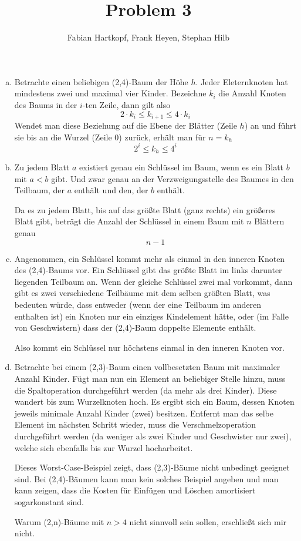 \documentclass{scrartcl}
\author{Fabian Hartkopf, Frank Heyen, Stephan Hilb}
\begin{document}
\title{Problem 3}
\maketitle

\begin{enumerate}[a)]
	\item
		 Betrachte einen beliebigen (2,4)-Baum der Höhe $h$.
		 Jeder Eleternknoten hat mindestens zwei und maximal vier Kinder.
		 Bezeichne $k_i$ die Anzahl Knoten des Baums in der $i$-ten Zeile, dann gilt also 
		 \[
			 2\cdot k_i \le k_{i+1} \le 4\cdot k_i
		 \]
		 Wendet man diese Beziehung auf die Ebene der Blätter (Zeile $h$) an und führt sie bis an die Wurzel (Zeile 0) zurück, erhält man für $n=k_h$
		 \[
			 2^i \le k_h \le 4^i
		 \]
	 \item
		 Zu jedem Blatt $a$ existiert genau ein Schlüssel im Baum, wenn es ein Blatt $b$ mit $a<b$ gibt.
		 Und zwar genau an der Verzweigungsstelle des Baumes in den Teilbaum, der $a$ enthält und den, der $b$ enthält.

		 Da es zu jedem Blatt, bis auf das größte Blatt (ganz rechts) ein größeres Blatt gibt, beträgt die Anzahl der Schlüssel in einem Baum mit $n$ Blättern genau
		 \[
			 n-1
		 \]
	 \item
		 Angenommen, ein Schlüssel kommt mehr als einmal in den inneren Knoten des (2,4)-Baums vor.
		 Ein Schlüssel gibt das größte Blatt im links darunter liegenden Teilbaum an.
		 Wenn der gleiche Schlüssel zwei mal vorkommt, dann gibt es zwei verschiedene Teilbäume mit dem selben größten Blatt, was bedeuten würde, dass entweder (wenn der eine Teilbaum im anderen enthalten ist) ein Knoten nur ein einziges Kindelement hätte, oder (im Falle von Geschwistern) dass der (2,4)-Baum doppelte Elemente enthält.

		 Also kommt ein Schlüssel nur höchstens einmal in den inneren Knoten vor.
	 \item
		 Betrachte bei einem (2,3)-Baum einen vollbesetzten Baum mit maximaler Anzahl Kinder.
		 Fügt man nun ein Element an beliebiger Stelle hinzu, muss die Spaltoperation durchgeführt werden (da mehr als drei Kinder).
		 Diese wandert bis zum Wurzelknoten hoch.
		 Es ergibt sich ein Baum, dessen Knoten jeweils minimale Anzahl Kinder (zwei) besitzen.
		 Entfernt man das selbe Element im nächsten Schritt wieder, muss die Verschmelzoperation durchgeführt werden (da weniger als zwei Kinder und Geschwister nur zwei), welche sich ebenfalls bis zur Wurzel hocharbeitet.

		 Dieses Worst-Case-Beispiel zeigt, dass (2,3)-Bäume nicht unbedingt geeignet sind.
		 Bei (2,4)-Bäumen kann man kein solches Beispiel angeben und man kann zeigen, dass die Kosten für Einfügen und Löschen amortisiert sogarkonstant sind.

		 Warum (2,n)-Bäume mit $n > 4$ nicht sinnvoll sein sollen, erschließt sich mir nicht.
\end{enumerate}
\end{document}
